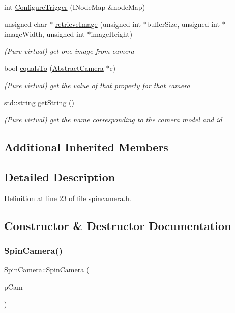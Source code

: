 \begin{DoxyCompactItemize}
int \mbox{\hyperlink{class_spin_camera_ac97107c1a201ab3c7e28d60302b28d0a}{Configure\+Trigger}} (I\+Node\+Map \&node\+Map)
\item 
unsigned char $\ast$ \mbox{\hyperlink{class_spin_camera_af93d61657150a85134a6193fed344442}{retrieve\+Image}} (unsigned int $\ast$buffer\+Size, unsigned int $\ast$image\+Width, unsigned int $\ast$image\+Height)
\begin{DoxyCompactList}\small\item\em (Pure virtual) get one image from camera \end{DoxyCompactList}\item 
bool \mbox{\hyperlink{class_spin_camera_a1c3344dcd483c0ba889e8bb64d688039}{equals\+To}} (\mbox{\hyperlink{class_abstract_camera}{Abstract\+Camera}} $\ast$c)
\begin{DoxyCompactList}\small\item\em (Pure virtual) get the value of that property for that camera \end{DoxyCompactList}\item 
std\+::string \mbox{\hyperlink{class_spin_camera_ad3b02eb926fbc4312e7f19e3834db576}{get\+String}} ()
\begin{DoxyCompactList}\small\item\em (Pure virtual) get the name corresponding to the camera model and id \end{DoxyCompactList}\end{DoxyCompactItemize}
\subsection*{Additional Inherited Members}


\subsection{Detailed Description}


Definition at line 23 of file spincamera.\+h.



\subsection{Constructor \& Destructor Documentation}
\mbox{\label{class_spin_camera_a448a5ad609674d1187641b0e3cc706d3}} 
\subsubsection{\texorpdfstring{SpinCamera()}{SpinCamera()}}
{\footnotesize\ttfamily Spin\+Camera\+::\+Spin\+Camera (\begin{DoxyParamCaption}\item[{Spinnaker\+::\+Camera\+Ptr}]{p\+Cam }\end{DoxyParamCaption})}



